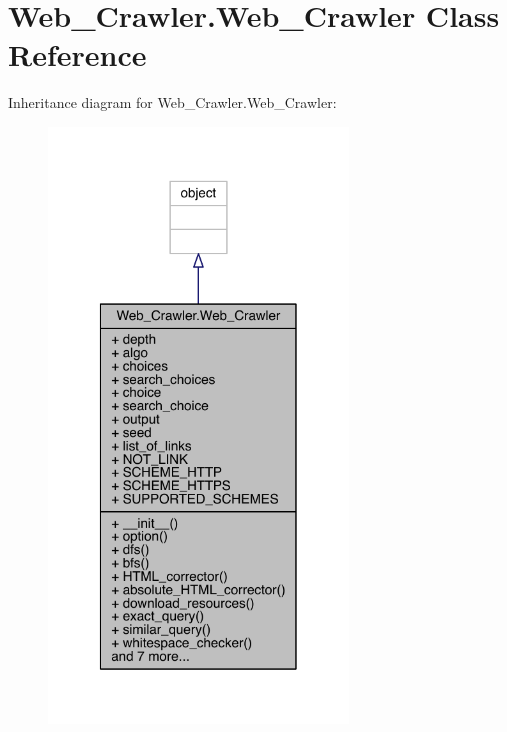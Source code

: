 \hypertarget{class_web___crawler_1_1_web___crawler}{}\section{Web\+\_\+\+Crawler.\+Web\+\_\+\+Crawler Class Reference}
\label{class_web___crawler_1_1_web___crawler}


Inheritance diagram for Web\+\_\+\+Crawler.\+Web\+\_\+\+Crawler\+:
\nopagebreak
\begin{figure}[H]
\begin{center}
\leavevmode
\includegraphics[width=226pt]{class_web___crawler_1_1_web___crawler__inherit__graph}
\end{center}
\end{figure}


